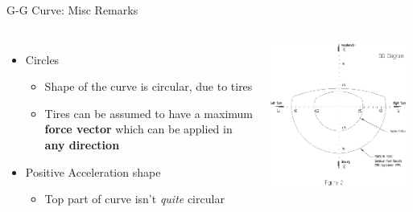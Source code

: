 \documentclass[aspectratio=169]{beamer}
\begin{document}
\begin{frame}{G-G Curve: Misc Remarks}
    \begin{columns}
    \begin{itemize}
        \item<+-> Circles
            \begin{itemize}
                \item<+-> Shape of the curve is circular, due to tires
                \item<+-> Tires can be assumed to have a maximum \textbf{force vector} which can be applied in \textbf{any direction}
            \end{itemize}
        \item<+-> Positive Acceleration shape
            \begin{itemize}
                \item<+-> Top part of curve isn't \textit{quite} circular
            \end{itemize}
    \end{itemize}

    \includegraphics[width=0.96\textwidth]{images/GG_Cars.png}
    \end{columns}
\end{frame}
\end{document}
